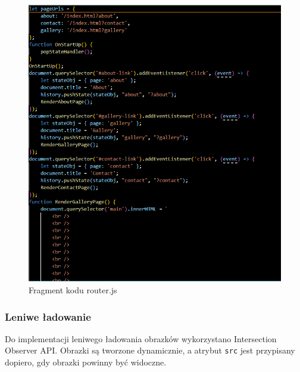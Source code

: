 \documentclass[a4paper,12pt]{article}
\begin{document}
\begin{figure}[H]
    \centering
    \includegraphics[width=1\textwidth]{images/js.png}
    \caption{Fragment kodu router.js}
\end{figure}

\subsubsection{Leniwe ładowanie}

Do implementacji leniwego ładowania obrazków wykorzystano Intersection Observer API. Obrazki są tworzone dynamicznie, a atrybut \texttt{src} jest przypisany dopiero, gdy obrazki powinny być widoczne.
\end{document}
